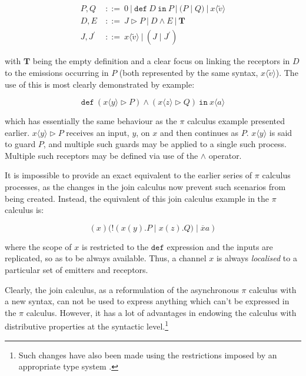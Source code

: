 \begin{align}
\label{joinsyntax}
  P, Q\ & ::=\ 
  0\ |\ 
  \mathtt{def}\ D\ \mathtt{in}\ P\ |\
  (P\;|\;Q)\ |\ 
  x\langle \tilde{v} \rangle \\
  D, E\ & ::=\
  J \rhd P\ |\
  D \wedge E\ |\ 
  \mathbf{T} \\
  J,J^\prime\ & ::=\ 
  x\langle \tilde{v} \rangle\ |\
  (J\;|\;J^\prime)
\end{align}

\noindent with $\mathbf{T}$ being the empty definition and a clear
focus on linking the receptors in $D$ to the emissions occurring in $P$
(both represented by the same syntax, $x\langle \tilde{v} \rangle$).
The use of this is most clearly demonstrated by example:

\begin{equation}
  \mathtt{def}\ (x\langle y \rangle \rhd P) \wedge (x\langle z \rangle \rhd Q)\ \mathtt{in}\ x \langle a \rangle
\end{equation}

\noindent which has essentially the same behaviour as the $\pi$
calculus example presented earlier.  $x\langle y \rangle \rhd P$
receives an input, $y$, on $x$ and then continues as $P$.  $x\langle y
\rangle$ is said to guard $P$, and multiple such guards may be applied
to a single such process.  Multiple such receptors may be defined via
use of the $\wedge$ operator.

It is impossible to provide an exact equivalent to the earlier series
of $\pi$ calculus processes, as the changes in the join calculus now
prevent such scenarios from being created.  Instead, the equivalent of
this join calculus example in the $\pi$ calculus is:

\begin{equation}
(x)(!(x(y).P\;|\;x(z).Q)\;|\;\overline{x}a)
\end{equation}

\noindent where the scope of $x$ is restricted to the $\mathtt{def}$
expression and the inputs are replicated, so as to be always
available.  Thus, a channel $x$ is always \emph{localised} to a
particular set of emitters and receptors.

Clearly, the join calculus, as a reformulation of the asynchronous
$\pi$ calculus with a new syntax, can not be used to express anything
which can't be expressed in the $\pi$ calculus.  However, it has a lot
of advantages in endowing the calculus with distributive properties at
the syntactic level.\footnote{Such changes have also been made using the
restrictions imposed by an appropriate type system \cite{sangiorgi:uniformreceptiveness}.}

